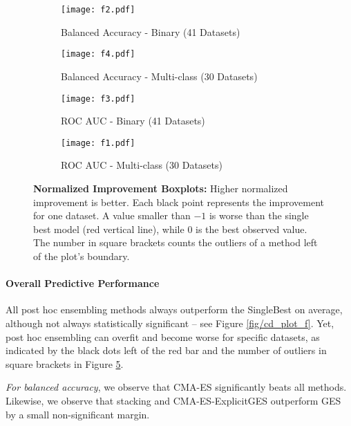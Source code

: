 \documentclass[11pt]{article}
\newcommand{\nbc}[3]{
		{\colorbox{#3}{\bfseries\sffamily\scriptsize\textcolor{white}{#1}}}
		{\textcolor{#3}{\sf\small$\blacktriangleright$\textit{#2}$\blacktriangleleft$}}
}
\newcommand{\changed}[1]{\nbc{CHANGED}{#1}{changedcolor}}
\renewcommand{\changed}[1]{{\color{changedcolor}#1}}
\renewcommand{\changed}[1]{{#1}}
\begin{document}
\begin{figure}
    \begin{subfigure}[t]{0.49\linewidth}
        \centering 
        \texttt{[image: f2.pdf]}
        \caption{Balanced Accuracy - Binary (41 Datasets)}
        \label{fig/ni_plot/bacc_b}
    \end{subfigure}
    \begin{subfigure}[t]{0.49\linewidth}
        \centering
        \texttt{[image: f4.pdf]}
        \caption{Balanced Accuracy - Multi-class (30 Datasets)} 
        \label{fig/ni_plot/bacc_m}
    \end{subfigure}
    \begin{subfigure}[t]{0.49\linewidth}
        \centering
        \texttt{[image: f3.pdf]}
        \caption{ROC AUC - Binary (41 \changed{Datasets})}
        \label{fig/ni_plot/roc_b}
    \end{subfigure}
    \begin{subfigure}[t]{0.49\linewidth}
        \centering
        \texttt{[image: f1.pdf]}
        \caption{ROC AUC - Multi-class (30 \changed{Datasets})}
    \label{fig/ni_plot/roc_m}
    \end{subfigure}

  
    \caption{\textbf{Normalized Improvement Boxplots: }{\normalfont 
    Higher normalized improvement is better. Each black point represents the improvement for one dataset. A value smaller than $-1$ is worse than the single best model (red vertical line), while $0$ is the best observed value.
    The number in square brackets counts the outliers of a method left of the plot's boundary.}
    }
    \label{fig/ni_plot}
\end{figure}

\paragraph{Overall Predictive Performance}
All post hoc ensembling methods always outperform the SingleBest on average, although not always statistically significant -- see Figure \ref{fig/cd_plot_f}. 
Yet, post hoc ensembling can overfit and become worse for specific datasets, as indicated by the black dots left of the red bar and the number of outliers in square brackets in Figure \ref{fig/ni_plot}.

\emph{For balanced accuracy}, we observe that CMA-ES significantly beats all methods. 
Likewise, we observe that stacking and CMA-ES-ExplicitGES outperform GES  by a small non-significant margin.
\end{document}
